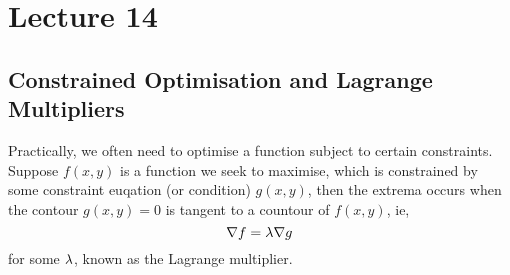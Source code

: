 \documentclass{report}
\begin{document}
\section{Lecture 14}
\subsection*{Constrained Optimisation and Lagrange Multipliers}
Practically, we often need to optimise a function subject to certain constraints. \\

Suppose $f(x,y)$ is a function we seek to maximise, which is constrained by some constraint euqation (or condition) $g(x,y)$, then the extrema occurs when the contour $g(x,y)=0$ is tangent to a countour of $f(x,y)$, ie,
$$
	\nabla f = \lambda\nabla g
$$
for some $\lambda$, known as the Lagrange multiplier.

\end{document}

